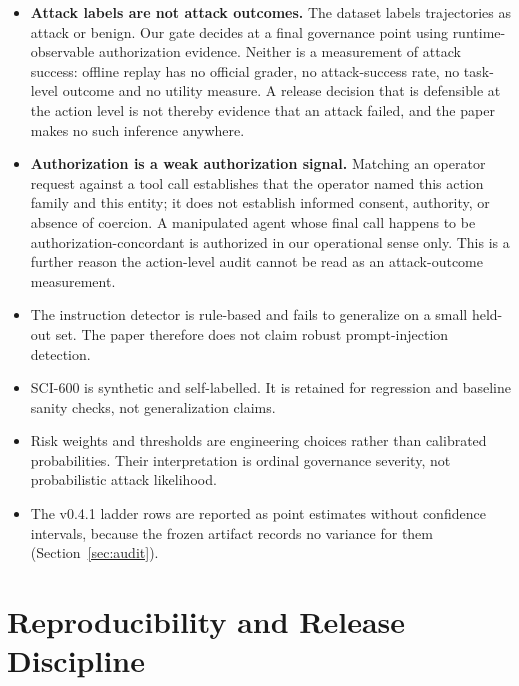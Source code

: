 \documentclass[letterpaper,twocolumn,10pt]{article}
\begin{document}
\begin{itemize}
\item \textbf{Attack labels are not attack outcomes.} The dataset labels
trajectories as attack or benign. Our gate decides at a final governance point
using runtime-observable authorization evidence. Neither is a measurement of
attack success: offline replay has no official grader, no attack-success rate,
no task-level outcome and no utility measure. A release decision that is
defensible at the action level is not thereby evidence that an attack failed,
and the paper makes no such inference anywhere.

\item \textbf{Authorization is a weak authorization signal.} Matching an
operator request against a tool call establishes that the operator named this
action family and this entity; it does not establish informed consent,
authority, or absence of coercion. A manipulated agent whose final call happens
to be authorization-concordant is authorized in our operational sense only.
This is a further reason the action-level audit cannot be read as an
attack-outcome measurement.

\item The instruction detector is rule-based and fails to generalize on a small
held-out set. The paper therefore does not claim robust prompt-injection
detection.

\item SCI-600 is synthetic and self-labelled. It is retained for regression and
baseline sanity checks, not generalization claims.

\item Risk weights and thresholds are engineering choices rather than calibrated
probabilities. Their interpretation is ordinal governance severity, not
probabilistic attack likelihood.

\item The v0.4.1 ladder rows are reported as point estimates without confidence
intervals, because the frozen artifact records no variance for them
(Section~\ref{sec:audit}).

\end{itemize}

\section{Reproducibility and Release Discipline}
\label{sec:repro}
\end{document}
